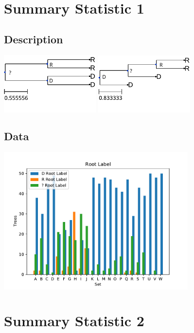 \documentclass[10pt,aspectratio=169,notheorems,hyperref={pdfauthor=whatever}]{beamer}
\begin{document}
\section{Summary Statistic 1}
\subsection{Description}
\begin{frame}
  \centering
  \includegraphics[width=5cm, angle=0]{sumstat1example}
  \includegraphics[width=5cm, angle=0]{sumstat1example2}
\end{frame}

\subsection{Data}
\begin{frame}
  \centering
  \includegraphics[width=10cm, angle=0]{sumstat1graph}
\end{frame}

\section{Summary Statistic 2}
\end{document}
